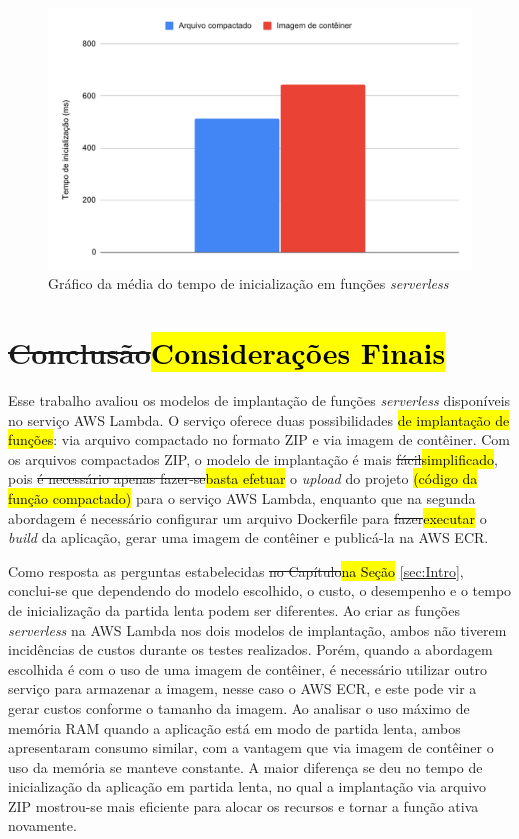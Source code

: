 \documentclass[10pt,conference]{IEEEtran}
\begin{document}
\begin{figure}[htbp]
    \centering 
    \includegraphics [width=\linewidth]{images/init-time-average-PT.pdf}
    \par
    \caption{Gráfico da média do tempo de inicialização em funções \textit{serverless}}
    \label{graph:functions_init_time_average}
\end{figure}

\section{\st{Conclusão}\hl{Considerações Finais}}
\label{sec:Conclusion}

Esse trabalho avaliou os modelos de implantação de funções \textit{serverless} disponíveis no serviço AWS Lambda. O serviço oferece duas possibilidades \hl{de implantação de funções}: via arquivo compactado no formato ZIP e via imagem de contêiner. Com os arquivos compactados ZIP, o modelo de implantação é mais \st{fácil}\hl{simplificado}, pois \st{é necessário apenas fazer-se}\hl{basta efetuar} o \textit{upload} do projeto \hl{(código da função compactado)} para o serviço AWS Lambda, enquanto que na segunda abordagem é necessário configurar um arquivo Dockerfile para \st{fazer}\hl{executar} o \textit{build} da aplicação, gerar uma imagem de contêiner e publicá-la na AWS ECR.

Como resposta as perguntas estabelecidas \st{no Capítulo}\hl{na Seção} \ref{sec:Intro}, conclui-se que dependendo do modelo escolhido, o custo, o desempenho e o tempo de inicialização da partida lenta podem ser diferentes.
Ao criar as funções \textit{serverless} na AWS Lambda nos dois modelos de implantação, ambos não tiverem incidências de custos durante os testes realizados. Porém, quando a abordagem escolhida é com o uso de uma imagem de contêiner, é necessário utilizar outro serviço para armazenar a imagem, nesse caso o AWS ECR, e este pode vir a gerar custos conforme o tamanho da imagem. Ao analisar o uso máximo de memória RAM quando a aplicação está em modo de partida lenta, ambos apresentaram consumo similar, com a vantagem que via imagem de contêiner o uso da memória se manteve constante. A maior diferença se deu no tempo de inicialização da aplicação em partida lenta, no qual a implantação via arquivo ZIP mostrou-se mais eficiente para alocar os recursos e tornar a função ativa novamente.
\end{document}
